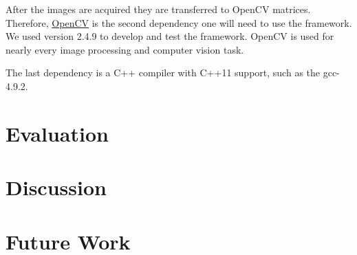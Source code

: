 \documentclass[11pt]{article}
\begin{document}
After the images are acquired they are transferred to OpenCV matrices. Therefore, \href{http://opencv.org/}{OpenCV} is the second dependency one will need to use the framework. We used version 2.4.9 to develop and test the framework. OpenCV is used for nearly every image processing and computer vision task.

The last dependency is a C++ compiler with C++11 support, such as the gcc-4.9.2.


\section{Evaluation}
\section{Discussion}
\section{Future Work}
\end{document}
